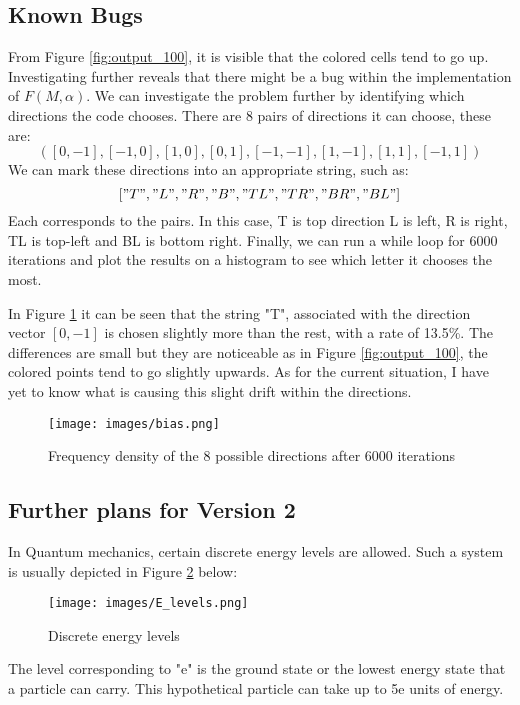 \subsection{Known Bugs}
From Figure \ref{fig:output_100}, it is visible that the colored cells tend to go up. Investigating further reveals that there might be a bug within the implementation of $F(M,\alpha)$. 
We can investigate the problem further by identifying which directions the code chooses. There are 8 pairs of directions it can choose, these are: 
$$([0, -1],[-1, 0], [1, 0], [0, 1], [-1, -1], [1, -1], [1, 1], [-1, 1])$$
We can mark these directions into an appropriate string, such as: $$["T","L","R","B","TL","TR","BR","BL"]$$ 
Each corresponds to the pairs. In this case, T is top direction L is left, R is right, TL is top-left and BL is bottom right. Finally, we can run a while loop for 6000 iterations and plot the results on a histogram to see which letter it chooses the most. \par

\vspace{0.3cm}
In Figure \ref{fig:bias} it can be seen that the string "T", associated with the direction vector $[0, -1]$ is chosen slightly more than the rest, with a rate of 13.5\%. The differences are small but they are noticeable as in Figure \ref{fig:output_100}, the colored points tend to go slightly upwards. As for the current situation, I have yet to know what is causing this slight drift within the directions. \par
\begin{figure}[H]
    \centering
    \texttt{[image: images/bias.png]}
    \caption{Frequency density of the 8 possible directions after 6000 iterations}
    \label{fig:bias}
\end{figure}
\subsection{Further plans for Version 2}
In Quantum mechanics, certain discrete energy levels are allowed. Such a system is usually depicted in Figure \ref{fig:e_levels} below: 
\begin{figure}[H]
    \centering
    \texttt{[image: images/E\_levels.png]}
    \caption{Discrete energy levels}
    \label{fig:e_levels}
\end{figure}
The level corresponding to "e" is the ground state or the lowest energy state that a particle can carry. This hypothetical particle can take up to 5e units of energy. \par

